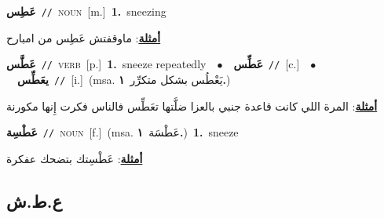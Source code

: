 \documentclass[10pt,a4paper,twoside]{article} %
\begin{document}
\begin{multicols}{2}
{\setlength\topsep{0pt}\textbf{\foreignlanguage{arabic}{عَطِس}}\ {\color{gray}\texttt{//}\color{black}}\ \textsc{noun}\ [m.]\ \textbf{1.}~sneezing\  \begin{flushright}\color{gray}\foreignlanguage{arabic}{\textbf{\underline{\foreignlanguage{arabic}{أمثلة}}}: ماوقفتش عَطِس من امبارح}\end{flushright}\color{black}} \vspace{2mm}

{\setlength\topsep{0pt}\textbf{\foreignlanguage{arabic}{عَطَّس}}\ {\color{gray}\texttt{//}\color{black}}\ \textsc{verb}\ [p.]\ \textbf{1.}~sneeze repeatedly\ \ $\bullet$\ \ \setlength\topsep{0pt}\textbf{\foreignlanguage{arabic}{عَطِّس}}\ {\color{gray}\texttt{//}\color{black}}\ [c.]\ \ $\bullet$\ \ \setlength\topsep{0pt}\textbf{\foreignlanguage{arabic}{يعَطِّس}}\ {\color{gray}\texttt{//}\color{black}}\ [i.]\ \color{gray}(msa. \foreignlanguage{arabic}{يَعْطُس بشكل متكرِّر}~\foreignlanguage{arabic}{\textbf{١.}})\color{black}\  \begin{flushright}\color{gray}\foreignlanguage{arabic}{\textbf{\underline{\foreignlanguage{arabic}{أمثلة}}}: المرة اللي كانت قاعدة جنبي بالعزا ضلَّتها تعَطِّس فالناس فكرت إِنها مكورنة}\end{flushright}\color{black}} \vspace{2mm}

{\setlength\topsep{0pt}\textbf{\foreignlanguage{arabic}{عَطْسِة}}\ {\color{gray}\texttt{//}\color{black}}\ \textsc{noun}\ [f.]\ \color{gray}(msa. \foreignlanguage{arabic}{عَطْسَة}~\foreignlanguage{arabic}{\textbf{١.}})\color{black}\ \textbf{1.}~sneeze\  \begin{flushright}\color{gray}\foreignlanguage{arabic}{\textbf{\underline{\foreignlanguage{arabic}{أمثلة}}}: عَطْسِتك بتضحك عفكرة}\end{flushright}\color{black}} \vspace{2mm}

\vspace{-3mm}
\subsection*{\color{blue}\foreignlanguage{arabic}{ع.ط.ش}\color{blue}{}} 


\end{multicols}
\end{document}
